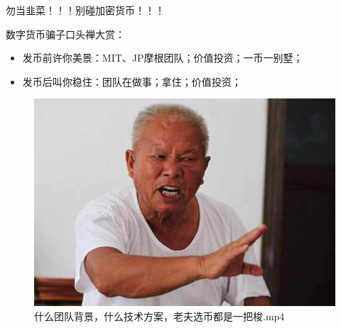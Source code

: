 \documentclass[11pt]{beamer}
\begin{document}
\begin{frame}{勿当韭菜！！！别碰加密货币！！！}
	
	{\color{red}
		数字货币骗子口头禅大赏：
		\begin{itemize}
			\item 发币前许你美景：MIT、JP摩根团队；价值投资；一币一别墅；
			\item 发币后叫你稳住：团队在做事；拿住；价值投资；
		\end{itemize}
	}
	\begin{figure}
		\centering
		\includegraphics[width=0.5\linewidth]{figures/AllInGrandpa}
		\caption{什么团队背景，什么技术方案，老夫选币都是一把梭.mp4}
		\label{fig:allingrandpa}
	\end{figure}
	
\end{frame}
\end{document}
